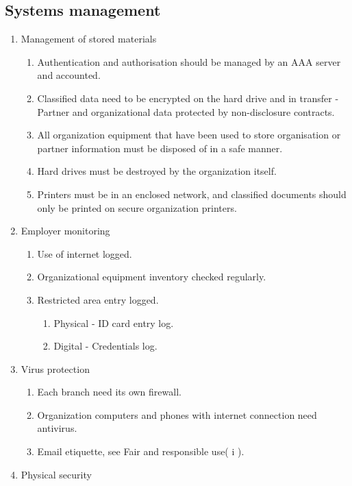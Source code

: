 \subsection{Systems management}

\begin{enumerate}
  \item Management of stored materials
  \begin{enumerate}
    \item Authentication and authorisation should be managed by an AAA server and accounted.
    \item Classified data need to be encrypted on the hard drive and in transfer - Partner and organizational data protected by non-disclosure contracts.
    \item All organization equipment that have been used to store organisation or partner information must be disposed of in a safe manner.
    \item Hard drives must be destroyed by the organization itself.
    \item Printers must be in an enclosed network, and classified documents should only be printed on secure organization printers.
  \end{enumerate}
  \item Employer monitoring
  \begin{enumerate}
    \item Use of internet logged.
    \item Organizational equipment inventory checked regularly.
    \item Restricted area entry logged.
    \begin{enumerate}
      \item Physical - ID card entry log.
      \item Digital - Credentials log.
    \end{enumerate}
  \end{enumerate}
  \item Virus protection
  \begin{enumerate}
    \item Each branch need its own firewall.
    \item Organization computers and phones with internet connection need antivirus.
    \item Email etiquette, see Fair and responsible use( i ).
  \end{enumerate}
  \item Physical security
  \begin{enumerate}

\end{enumerate}
\end{enumerate}
